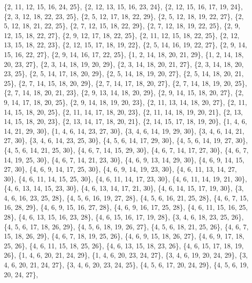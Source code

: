 \documentclass[11pt,a4paper]{article}
\begin{document}
{\{2, 11, 12, 15, 16, 24, 25\}, \{2, 12, 13, 15, 16, 23, 24\}, \{2, 12, 15, 16, 17, 19, 24\}, \{2, 3, 12, 18, 22, 23, 25\}, \{2, 5, 12, 17, 18, 22, 29\},
\{2, 5, 12, 18, 19, 22, 27\}, \{2, 5, 12, 18, 21, 22, 25\}, \{2, 7, 12, 15, 18, 22, 29\}, \{2, 7, 12, 18, 19, 22, 25\}, \{2, 9, 12, 15, 18, 22, 27\},
\{2, 9, 12, 17, 18, 22, 25\}, \{2, 11, 12, 15, 18, 22, 25\}, \{2, 12, 13, 15, 18, 22, 23\}, \{2, 12, 15, 17, 18, 19, 22\}, \{2, 5, 14, 16, 19, 22, 27\},
\{2, 9, 14, 15, 16, 22, 27\}, \{2, 9, 14, 16, 17, 22, 25\}, \{1, 2, 14, 18, 20, 21, 29\}, \{1, 2, 14, 18, 20, 23, 27\}, \{2, 3, 14, 18, 19, 20, 29\},
\{2, 3, 14, 18, 20, 21, 27\}, \{2, 3, 14, 18, 20, 23, 25\}, \{2, 5, 14, 17, 18, 20, 29\}, \{2, 5, 14, 18, 19, 20, 27\}, \{2, 5, 14, 18, 20, 21, 25\},
\{2, 7, 14, 15, 18, 20, 29\}, \{2, 7, 14, 17, 18, 20, 27\}, \{2, 7, 14, 18, 19, 20, 25\}, \{2, 7, 14, 18, 20, 21, 23\}, \{2, 9, 13, 14, 18, 20, 29\},
\{2, 9, 14, 15, 18, 20, 27\}, \{2, 9, 14, 17, 18, 20, 25\}, \{2, 9, 14, 18, 19, 20, 23\}, \{2, 11, 13, 14, 18, 20, 27\}, \{2, 11, 14, 15, 18, 20, 25\},
\{2, 11, 14, 17, 18, 20, 23\}, \{2, 11, 14, 18, 19, 20, 21\}, \{2, 13, 14, 15, 18, 20, 23\}, \{2, 13, 14, 17, 18, 20, 21\}, \{2, 14, 15, 17, 18, 19, 20\},
\{1, 4, 6, 14, 21, 29, 30\}, \{1, 4, 6, 14, 23, 27, 30\}, \{3, 4, 6, 14, 19, 29, 30\}, \{3, 4, 6, 14, 21, 27, 30\}, \{3, 4, 6, 14, 23, 25, 30\},
\{4, 5, 6, 14, 17, 29, 30\}, \{4, 5, 6, 14, 19, 27, 30\}, \{4, 5, 6, 14, 21, 25, 30\}, \{4, 6, 7, 14, 15, 29, 30\}, \{4, 6, 7, 14, 17, 27, 30\},
\{4, 6, 7, 14, 19, 25, 30\}, \{4, 6, 7, 14, 21, 23, 30\}, \{4, 6, 9, 13, 14, 29, 30\}, \{4, 6, 9, 14, 15, 27, 30\}, \{4, 6, 9, 14, 17, 25, 30\},
\{4, 6, 9, 14, 19, 23, 30\}, \{4, 6, 11, 13, 14, 27, 30\}, \{4, 6, 11, 14, 15, 25, 30\}, \{4, 6, 11, 14, 17, 23, 30\}, \{4, 6, 11, 14, 19, 21, 30\},
\{4, 6, 13, 14, 15, 23, 30\}, \{4, 6, 13, 14, 17, 21, 30\}, \{4, 6, 14, 15, 17, 19, 30\}, \{3, 4, 6, 16, 23, 25, 28\}, \{4, 5, 6, 16, 19, 27, 28\},
\{4, 5, 6, 16, 21, 25, 28\}, \{4, 6, 7, 15, 16, 28, 29\}, \{4, 6, 9, 15, 16, 27, 28\}, \{4, 6, 9, 16, 17, 25, 28\}, \{4, 6, 11, 15, 16, 25, 28\},
\{4, 6, 13, 15, 16, 23, 28\}, \{4, 6, 15, 16, 17, 19, 28\}, \{3, 4, 6, 18, 23, 25, 26\}, \{4, 5, 6, 17, 18, 26, 29\}, \{4, 5, 6, 18, 19, 26, 27\},
\{4, 5, 6, 18, 21, 25, 26\}, \{4, 6, 7, 15, 18, 26, 29\}, \{4, 6, 7, 18, 19, 25, 26\}, \{4, 6, 9, 15, 18, 26, 27\}, \{4, 6, 9, 17, 18, 25, 26\},
\{4, 6, 11, 15, 18, 25, 26\}, \{4, 6, 13, 15, 18, 23, 26\}, \{4, 6, 15, 17, 18, 19, 26\}, \{1, 4, 6, 20, 21, 24, 29\}, \{1, 4, 6, 20, 23, 24, 27\},
\{3, 4, 6, 19, 20, 24, 29\}, \{3, 4, 6, 20, 21, 24, 27\}, \{3, 4, 6, 20, 23, 24, 25\}, \{4, 5, 6, 17, 20, 24, 29\}, \{4, 5, 6, 19, 20, 24, 27\},
}
\end{document}
